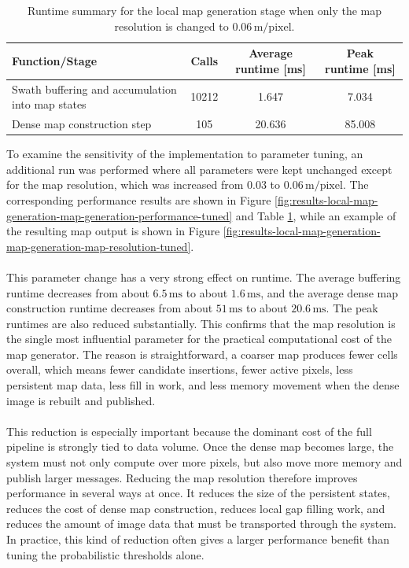 \begin{table}[H]
    \centering
    \caption{Runtime summary for the local map generation stage when only the map resolution is changed to $0.06\,\mathrm{m/pixel}$.}
    \label{tab:results-local-map-generation-map-generation-runtime-tuned}
    \begin{tabular}{l c c c}
        \hline
        Function/Stage & Calls & Average runtime [ms] & Peak runtime [ms] \\
        \hline
        Swath buffering and accumulation into map states & 10212 & 1.647 & 7.034 \\
        Dense map construction step & 105 & 20.636 & 85.008 \\
        \hline
    \end{tabular}
\end{table}
\noindent
To examine the sensitivity of the implementation to parameter tuning, an additional run was performed where all parameters were kept unchanged except for the map resolution, which was increased from $0.03$ to $0.06\,\mathrm{m/pixel}$. The corresponding performance results are shown in Figure \ref{fig:results-local-map-generation-map-generation-performance-tuned} and Table \ref{tab:results-local-map-generation-map-generation-runtime-tuned}, while an example of the resulting map output is shown in Figure \ref{fig:results-local-map-generation-map-generation-map-resolution-tuned}.
\\ \\
This parameter change has a very strong effect on runtime. The average buffering runtime decreases from about $6.5\,\mathrm{ms}$ to about $1.6\,\mathrm{ms}$, and the average dense map construction runtime decreases from about $51\,\mathrm{ms}$ to about $20.6\,\mathrm{ms}$. The peak runtimes are also reduced substantially. This confirms that the map resolution is the single most influential parameter for the practical computational cost of the map generator. The reason is straightforward, a coarser map produces fewer cells overall, which means fewer candidate insertions, fewer active pixels, less persistent map data, less fill in work, and less memory movement when the dense image is rebuilt and published.
\\ \\
This reduction is especially important because the dominant cost of the full pipeline is strongly tied to data volume. Once the dense map becomes large, the system must not only compute over more pixels, but also move more memory and publish larger messages. Reducing the map resolution therefore improves performance in several ways at once. It reduces the size of the persistent states, reduces the cost of dense map construction, reduces local gap filling work, and reduces the amount of image data that must be transported through the system. In practice, this kind of reduction often gives a larger performance benefit than tuning the probabilistic thresholds alone.
